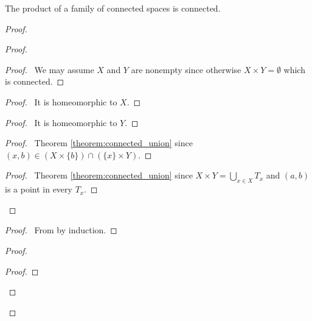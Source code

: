 \begin{theorem}
    \label{theorem:product_connected}
    The product of a family of connected spaces is connected.
\end{theorem}

\begin{proof}
    \pf
    \begin{proof}
        \begin{proof}
            \pf\ We may assume $X$ and $Y$ are nonempty since otherwise $X \times Y = \emptyset$ which is connected.
        \end{proof}
        \begin{proof}
            \pf\ It is homeomorphic to $X$.
        \end{proof}
        \begin{proof}
            \pf\ It is homeomorphic to $Y$.
        \end{proof}
        \begin{proof}
            \pf\ Theorem \ref{theorem:connected_union} since $(x,b) \in (X \times \{b\}) \cap (\{x\} \times Y)$.
        \end{proof}
        \begin{proof}
            \pf\ Theorem \ref{theorem:connected_union} since $X \times Y = \bigcup_{x \in X} T_x$ and $(a,b)$ is a point in every $T_x$.
        \end{proof}
    \end{proof}
    \begin{proof}
        \pf\ From  by induction.
    \end{proof}
    \begin{proof}
        \begin{proof}

\end{proof}
\end{proof}
\end{proof}
